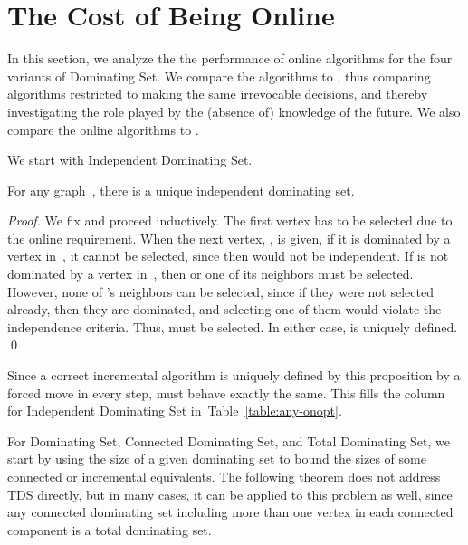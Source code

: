\section{The Cost of Being Online}

In this section, we analyze the the performance of online algorithms
for the four variants of Dominating Set.
We compare the algorithms to \onopt, thus comparing algorithms restricted
to making the same irrevocable decisions, and thereby
investigating the role played by the
(absence of) knowledge of the future.
We also compare the online algorithms to \offopt.

We start with Independent Dominating Set.
\begin{proposition}
For any graph~, there is a unique \incr independent dominating set.
\end{proposition}
\begin{proof}
We fix  and proceed inductively.
The first vertex has to be selected due to the online requirement.
When the next vertex, , is given, if it is dominated by a vertex 
in~,
it cannot be selected, since then  would not be independent.
If  is not dominated by a vertex in~, then
 or one of its neighbors must be selected.
However, none of 's neighbors can be selected, since if they
were not selected already, then they are dominated, and selecting one
of them would violate the independence criteria.
Thus,  must be selected.
In either case,  is uniquely defined. 
\qed\end{proof}

Since a correct incremental algorithm is uniquely defined by this proposition
by a forced move in every step, \onopt must behave exactly the same.
This fills the column for Independent Dominating Set
in~Table~\ref{table:any-onopt}.

For Dominating Set, Connected Dominating Set, and Total Dominating
Set, we start by using the size of a given dominating set to bound the
sizes of some connected or incremental equivalents. 
The following theorem does not address TDS directly, but in many
cases, it can be applied to this problem as well, since any connected
dominating set including more than one vertex in each connected
component is a total dominating set.

